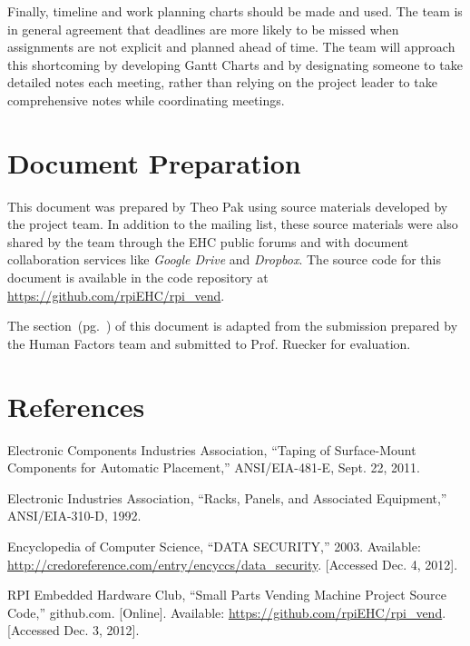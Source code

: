 \documentclass[12pt,oneside,final]{article}
\begin{document}
Finally, timeline and work planning charts should be made and used. The team is in general agreement that deadlines are more likely to be missed when assignments are not explicit and planned ahead of time. The team will approach this shortcoming by developing Gantt Charts and by designating someone to take detailed notes each meeting, rather than relying on the project leader to take comprehensive notes while coordinating meetings.


\appendix

\section{Document Preparation}
This document was prepared by Theo Pak using source materials developed by the project team. In addition to the mailing list, these source materials were also shared by the team through the EHC public forums and with document collaboration services like \emph{Google Drive} and \emph{Dropbox}. The source code for this document is available in the code repository at \url{https://github.com/rpiEHC/rpi_vend}.

The \emph{} section~(pg.~\pageref{sec:hf}) of this document is adapted from the submission prepared by the Human Factors team and submitted to Prof. Ruecker for evaluation.


\section{References}
\label{ref:refs}



\begin{thebibliography}{1}


   Electronic Components Industries Association, ``Taping of Surface-Mount Components for Automatic Placement,'' ANSI/EIA-481-E, Sept. 22, 2011.

   Electronic Industries Association, ``Racks, Panels, and Associated Equipment,'' ANSI/EIA-310-D, 1992.

   Encyclopedia of Computer Science, ``DATA SECURITY,'' 2003. Available: \url{http://credoreference.com/entry/encyccs/data_security}. [Accessed Dec. 4, 2012].

   RPI Embedded Hardware Club, ``Small Parts Vending Machine Project Source Code,'' github.com. [Online]. Available: \url{https://github.com/rpiEHC/rpi_vend}. [Accessed Dec. 3, 2012].

\end{thebibliography}
\end{document}
